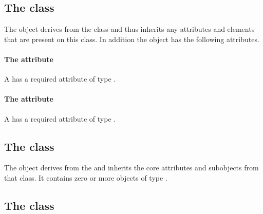 \subsection{The  class}
\label{domaintype-class}




The \DomainType object derives from the \SBase class and thus inherits
any attributes and elements that are present on this class.
In addition the \DomainType object has the following attributes.

\paragraph{The \fixttspace{} attribute}

A \DomainType has a required attribute  of type
.


\paragraph{The \fixttspace{} attribute}

A \DomainType has a required attribute  of type
.


\subsection{The  class}
\label{listofdomains-class}


The \ListOfDomains object derives from the  and inherits
the core attributes and subobjects from that class. It contains zero or
more objects of type \Domain.

\subsection{The  class}
\label{domain-class}

